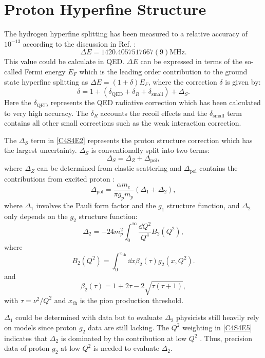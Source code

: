 \section{Proton Hyperfine Structure}
\label{C4S4}

The hydrogen hyperfine splitting has been measured to a relative accuracy of $10^{-13}$ according to the discussion in Ref. \cite{Nazaryan2006}:
\begin{equation} \label{C4S4E1}
\Delta E = 1420.405 751 766 7(9) \text{MHz}.
\end{equation}
This value could be calculate in QED. $\Delta E$ can be expressed in terms of the so-called Fermi energy $E_F$ which is the leading order contribution to the ground state hyperfine splitting as $\Delta E = (1+\delta)E_F$, where the correction $\delta$ is given by:
\begin{equation} \label{C4S4E2}
\delta = 1+(\delta_{\mathrm{QED}}+\delta_R+\delta_{\mathrm{small}})+\Delta_S.
\end{equation}
Here the $\delta_{\mathrm{QED}}$ represents the QED radiative correction which has been calculated to very high accuracy. The $\delta_R$ accounts the recoil effects and the $\delta_{\mathrm{small}}$ term contains all other small corrections such as the weak interaction correction.

The $\Delta_S$ term in \cref{C4S4E2} represents the proton structure correction which has the largest uncertainty. $\Delta_S$ is conventionally split into two terms:
\begin{equation} \label{C4S4E3}
\Delta_S = \Delta_Z+\Delta_{\mathrm{pol}},
\end{equation}
where $\Delta_Z$ can be determined from elastic scattering \cite{GEP} and $\Delta_{\mathrm{pol}}$ contains the contributions from excited proton \cite{Iddings1965,Faustov2002}:
\begin{equation} \label{C4S4E4}
\Delta_{\text{pol}} = \frac{\alpha m_e}{\pi g_pm_p}(\Delta_1+\Delta_2),
\end{equation}
where $\Delta_1$ involves the Pauli form factor and the $g_1$ structure function, and $\Delta_2$ only depends on the $g_2$ structure function:
\begin{equation} \label{C4S4E5}
\Delta_2 = -24m_p^2\int_0^{\infty}\frac{\dd{Q}^2}{Q^4}B_2(Q^2),
\end{equation}
where
\begin{equation} \label{C4S4E6}
B_2(Q^2) = \int_0^{x_{\mathrm{th}}}\dd{x}\beta_2(\tau)g_2(x,Q^2).
\end{equation}
and
\begin{equation} \label{C4S4E7}
\beta_2(\tau) = 1+2\tau-2\sqrt{\tau(\tau+1)},
\end{equation}
with $\tau=\nu^2/Q^2$ and $x_{\mathrm{th}}$ is the pion production threshold.

$\Delta_1$ could be determined with data but to evaluate $\Delta_2$ physicists still heavily rely on models since proton $g_2$ data are still lacking. The $Q^2$ weighting in \cref{C4S4E5} indicates that $\Delta_2$ is dominated by the contribution at low $Q^2$ \cite{Nazaryan2006}. Thus, precision data of proton $g_2$ at low $Q^2$ is needed to evaluate $\Delta_2$.

